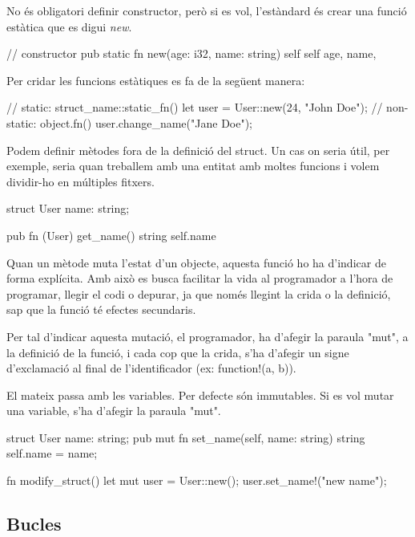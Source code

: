 ﻿\documentclass{article}
\begin{document}
No és obligatori definir constructor, però si es vol, l'estàndard és crear una
funció estàtica que es digui \textit{new}.

\begin{code}
// constructor
pub static fn new(age: i32, name: string) self {
    self {
        age,
        name,
    }
}
\end{code}

Per cridar les funcions estàtiques es fa de la següent manera:

\begin{code}
// static: struct_name::static_fn()
let user = User::new(24, "John Doe");
// non-static: object.fn()
user.change_name("Jane Doe");
\end{code}

Podem definir mètodes fora de la definició del struct. Un cas on seria útil,
per exemple, seria quan treballem amb una entitat amb moltes funcions i volem
dividir-ho en múltiples fitxers.

\begin{code}
struct User {
    name: string;
}

pub fn (User) get_name() string {
    self.name
}
\end{code}

Quan un mètode muta l'estat d'un objecte, aquesta funció ho ha d'indicar de forma
explícita. Amb això es busca facilitar la vida al programador a l'hora de programar,
llegir el codi o depurar, ja que només llegint la crida o la definició, sap que
la funció té efectes secundaris.

Per tal d'indicar aquesta mutació, el programador, ha d'afegir la paraula "mut",
a la definició de la funció, i cada cop que la crida, s'ha d'afegir un signe
d'exclamació al final de l'identificador (ex: {\ttfamily function!(a, b)}).

El mateix passa amb les variables. Per defecte són immutables. Si es vol mutar
una variable, s'ha d'afegir la paraula "mut".

\begin{code}
struct User {
    name: string;
    pub mut fn set_name(self, name: string) string {
        self.name = name;
    }
}

fn modify_struct() {
    let mut user = User::new();
    user.set_name!("new name");
}
\end{code}

\subsection{Bucles}
\end{document}
